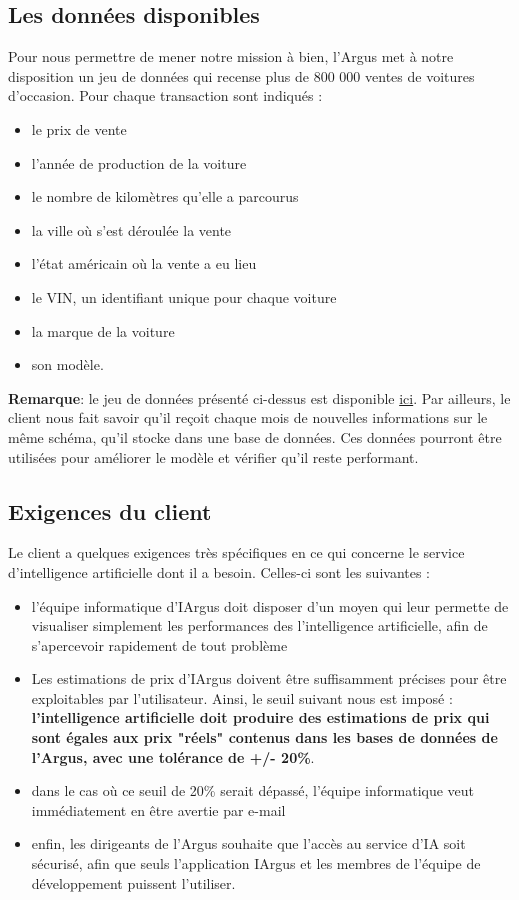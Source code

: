 \documentclass[french]{article}
\begin{document}
    \subsection{Les données disponibles}
    Pour nous permettre de mener notre mission à bien, l'Argus met à notre disposition un jeu de données qui recense plus de 800 000 ventes de voitures d'occasion. Pour chaque transaction sont indiqués :
    \begin{itemize}
        \item le prix de vente
        \item l'année de production de la voiture
        \item le nombre de kilomètres qu'elle a parcourus
        \item la ville où s'est déroulée la vente
        \item l'état américain où la vente a eu lieu
        \item le VIN, un identifiant unique pour chaque voiture
        \item la marque de la voiture
        \item son modèle.
    \end{itemize}
    \textbf{Remarque}: le jeu de données présenté ci-dessus est disponible \href{https://www.kaggle.com/datasets/harikrishnareddyb/used-car-price-predictions/data}{ici}.
    Par ailleurs, le client nous fait savoir qu'il reçoit chaque mois de nouvelles informations sur le même schéma, qu'il stocke dans une base de données. Ces données pourront être utilisées pour améliorer le modèle et vérifier qu'il reste performant.
    \subsection{Exigences du client}
    Le client a quelques exigences très spécifiques en ce qui concerne le service d'intelligence artificielle dont il a besoin. Celles-ci sont les suivantes :
    \begin{itemize}
        \item l'équipe informatique d'IArgus doit disposer d'un moyen qui leur permette de visualiser simplement les performances des l'intelligence artificielle, afin de s'apercevoir rapidement de tout problème
        \item Les estimations de prix d'IArgus doivent être suffisamment précises pour être exploitables par l'utilisateur. Ainsi, le seuil suivant nous est imposé : \textbf{l'intelligence artificielle doit produire des estimations de prix qui sont égales aux prix "réels" contenus dans les bases de données de l'Argus, avec une tolérance de +/- 20\%}. \item dans le cas où ce seuil de 20\% serait dépassé, l'équipe informatique veut immédiatement en être avertie par e-mail
        \item enfin, les dirigeants de l'Argus souhaite que l'accès au service d'IA soit sécurisé, afin que seuls l'application IArgus et les membres de l'équipe de développement puissent l'utiliser.
    \end{itemize}
\end{document}
